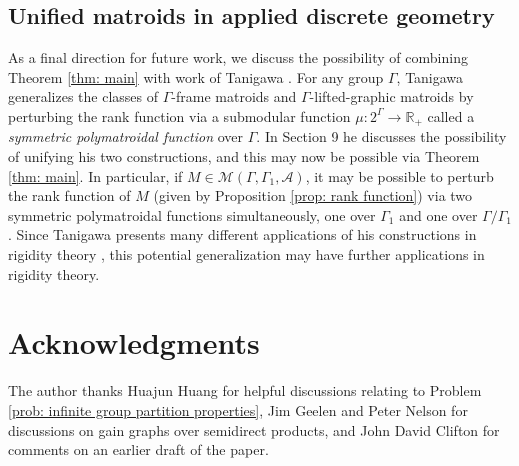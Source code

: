 \documentclass[12pt]{article}
\theoremstyle{definition}
\newcommand{\bR}{\mathbb R}
\newcommand{\cA}{\mathcal{A}}
\newcommand{\cM}{\mathcal{M}}
\begin{document}
\subsection{Unified matroids in applied discrete geometry}

As a final direction for future work, we discuss the possibility of combining Theorem \ref{thm: main} with work of Tanigawa \cite{Tanigawa-2015}.
For any group $\Gamma$, Tanigawa generalizes the classes of $\Gamma$-frame matroids \cite[Section 4]{Tanigawa-2015} and $\Gamma$-lifted-graphic matroids \cite[Section 8]{Tanigawa-2015} by perturbing the rank function via a  submodular function $\mu \colon 2^{\Gamma} \to \bR_+$ called a \emph{symmetric polymatroidal function} over $\Gamma$.
In Section 9 he discusses the possibility of unifying his two constructions, and this may now be possible via Theorem \ref{thm: main}.
In particular, if $M \in \cM(\Gamma, \Gamma_1, \cA)$, it may be possible to perturb the rank function of $M$ (given by Proposition \ref{prop: rank function}) via two symmetric polymatroidal functions simultaneously, one over $\Gamma_1$ and one over $\Gamma/\Gamma_1$.
Since Tanigawa presents many different applications of his constructions in rigidity theory \cite[Section 1.1]{Tanigawa-2015}, this potential generalization may have further applications in rigidity theory.


\section*{Acknowledgments}
The author thanks Huajun Huang for helpful discussions relating to Problem \ref{prob: infinite group partition properties}, Jim Geelen and Peter Nelson for discussions on gain graphs over semidirect products, and John David Clifton for comments on an earlier draft of the paper.




\end{document}

